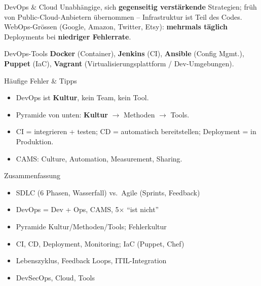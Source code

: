 \documentclass[a4paper, fontsize=7pt]{scrartcl}
\begin{document}
\begin{mainbox}{DevOps \& Cloud}
Unabhängige, sich \textbf{gegenseitig verstärkende} Strategien; früh von
Public-Cloud-Anbietern übernommen -- Infrastruktur ist Teil des Codes.
WebOps-Grössen (Google, Amazon, Twitter, Etsy): \textbf{mehrmals täglich}
Deployments bei \textbf{niedriger Fehlerrate}.
\end{mainbox}

\begin{subbox}{DevOps-Tools}
\textbf{Docker} (Container), \textbf{Jenkins} (CI), \textbf{Ansible}
(Config Mgmt.), \textbf{Puppet} (IaC), \textbf{Vagrant}
(Virtualisierungsplattform / Dev-Umgebungen).
\end{subbox}

\begin{subbox}{Häufige Fehler \& Tipps}
\begin{itemize}
    \item DevOps ist \textbf{Kultur}, kein Team, kein Tool.
    \item Pyramide von unten: \textbf{Kultur} $\to$ Methoden $\to$ Tools.
    \item CI = integrieren + testen; CD = automatisch bereitstellen;
          Deployment = in Produktion.
    \item CAMS: Culture, Automation, Measurement, Sharing.
\end{itemize}
\end{subbox}

\begin{subbox}{Zusammenfassung}
\begin{itemize}
    \item SDLC (6 Phasen, Wasserfall) vs.\ Agile (Sprints, Feedback)
    \item DevOps = Dev + Ops, CAMS, 5$\times$ ``ist nicht''
    \item Pyramide Kultur/Methoden/Tools; Fehlerkultur
    \item CI, CD, Deployment, Monitoring; IaC (Puppet, Chef)
    \item Lebenszyklus, Feedback Loops, ITIL-Integration
    \item DevSecOps, Cloud, Tools
\end{itemize}
\end{subbox}

%
%
%
\end{document}
